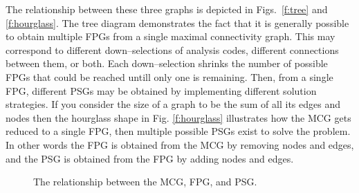 The relationship between these three graphs is depicted in Figs.~\ref{f:tree} and \ref{f:hourglass}. 
The tree diagram demonstrates the fact that it is generally possible to obtain 
multiple FPGs from a single maximal connectivity graph. This  may correspond to 
different down--selections of analysis codes, different connections between them, 
or both. Each down--selection shrinks the number of possible FPGs that could be reached 
untill only one is remaining. Then, from a single FPG, different PSGs may be obtained by implementing 
different solution strategies. If you consider the size of a graph to be the sum of all its
edges and nodes then the hourglass shape in Fig. \ref{f:hourglass} illustrates how
the MCG gets reduced to a single FPG, then multiple possible PSGs exist to solve the problem.
In other words the FPG is obtained from the MCG by removing nodes and edges, 
and the PSG is obtained from the FPG by adding nodes and edges.

\begin{figure}[htb!]
    \centering
\caption{The relationship between the MCG, FPG, and PSG.}
\end{figure}




